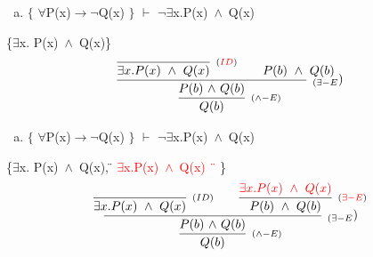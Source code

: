 \documentclass[aspectratio=43]{beamer}
\newcommand{\ria}{$\rightarrow$}
\newcommand{\fall}{$\forall$}
\newcommand{\ex}{$\exists$}
\newcommand{\nao}{$\neg$}
\newcommand{\nex}{\nao\ex}
\newcommand{\andd}{$\wedge$}
\begin{document}
    \begin{frame}[fragile]
    	
    	\begin{enumerate}[b)]
			
			\item $\{$ \fall P(x)\ria \nao Q(x) $\}$ $\vdash$ \nex  x.P(x)\ \andd\ Q(x) \\ 
			
		\end{enumerate}
        \{\ex  x. P(x)\ \andd\ Q(x)\}
        \vspace{85pt}
        \[
        \begin{array}{c}
		
        	\infer[_{(\land-E)}]
            {Q(b)}
            {\infer[_{(\exists-E})]
                {P(b)\ $\andd$\ Q(b)}
            	{\infer[_{(\textcolor{red}{ID})}] 
                	{\exists x.P(x)\ \wedge\ Q(x)}
                    {}
               	\hspace{20pt} 
                P(b)\ \wedge\ Q(b)
                }
            }
		\end{array}
        \]
        
	\end{frame}
    
    \begin{frame}[fragile]
    	
    	\begin{enumerate}[b)]
			
			\item $\{$ \fall P(x)\ria \nao Q(x) $\}$ $\vdash$ \nex  x.P(x)\ \andd\ Q(x) \\ 
			
		\end{enumerate}
        \{\ex  x. P(x)\ \andd\ Q(x), \textcolor{red}{\" \ex x.P(x)\ \andd \ Q(x) \"\ } \}
        \vspace{85pt}
        \[
        \begin{array}{c}
		
        	\infer[_{(\land-E)}]
            {Q(b)}
            {\infer[_{(\exists-E})]
                {P(b)\ $\andd$\ Q(b)}
            	{\infer[_{(ID)}] 
                	{\exists x.P(x)\ \wedge\ Q(x)}
                    {}
               	\hspace{20pt} 
                \infer[_{(\textcolor{red}{\exists -E})}] 
                	{P(b)\ \wedge\ Q(b)}
                    {\textcolor{red}{\exists x.P(x)\ \wedge \ Q(x)}}
                }
            }
		\end{array}
        \]
        
	\end{frame}
    
\end{document}

